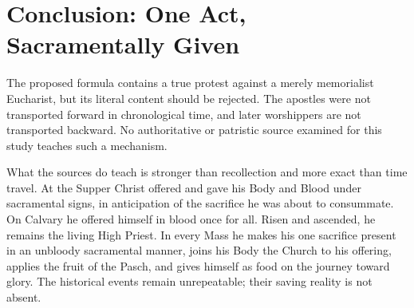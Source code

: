 \section{Conclusion: One Act, Sacramentally Given}

The proposed formula contains a true protest against a merely memorialist
Eucharist, but its literal content should be rejected. The apostles were not
transported forward in chronological time, and later worshippers are not
transported backward. No authoritative or patristic source examined for this
study teaches such a mechanism.

What the sources do teach is stronger than recollection and more exact than
time travel. At the Supper Christ offered and gave his Body and Blood under
sacramental signs, in anticipation of the sacrifice he was about to consummate.
On Calvary he offered himself in blood once for all. Risen and
ascended, he remains the living High Priest. In every Mass he makes his one
sacrifice present in an unbloody sacramental manner, joins his Body the Church
to his offering, applies the fruit of the Pasch, and gives himself as food on
the journey toward glory. The historical events remain unrepeatable; their
saving reality is not absent.

